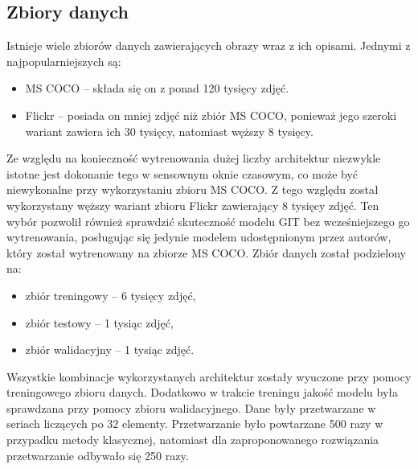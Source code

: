 \subsection{Zbiory danych}
Istnieje wiele zbiorów danych zawierających obrazy wraz z ich opisami. Jednymi z najpopularniejszych są:
\begin{itemize}
    \item MS COCO \cite{mscoco} -- składa się on z ponad 120 tysięcy zdjęć.
    \item Flickr \cite{flickr30k} -- posiada on mniej zdjęć niż zbiór MS COCO, ponieważ jego szeroki wariant zawiera ich 30 tysięcy, natomiast węższy 8 tysięcy.
\end{itemize}
Ze względu na konieczność wytrenowania dużej liczby architektur niezwykle istotne jest dokonanie tego w sensownym oknie czasowym, co może być niewykonalne przy wykorzystaniu zbioru MS COCO. Z tego względu został wykorzystany węższy wariant zbioru Flickr zawierający 8 tysięcy zdjęć. Ten wybór pozwolił również sprawdzić skuteczność modelu GIT bez wcześniejszego go wytrenowania, posługując się jedynie modelem udostępnionym przez autorów, który został wytrenowany na zbiorze MS COCO.
Zbiór danych został podzielony na:
\begin{itemize}
    \item zbiór treningowy -- 6 tysięcy zdjęć,
    \item zbiór testowy -- 1 tysiąc zdjęć,
    \item zbiór walidacyjny -- 1 tysiąc zdjęć.
\end{itemize}

\noindent Wszystkie kombinacje wykorzystanych architektur zostały wyuczone przy pomocy treningowego zbioru danych. Dodatkowo w trakcie treningu jakość modelu była sprawdzana przy pomocy zbioru walidacyjnego. Dane były przetwarzane w seriach liczących po 32 elementy. Przetwarzanie było powtarzane 500 razy w przypadku metody klasycznej, natomiast dla zaproponowanego rozwiązania przetwarzanie odbywało się 250 razy.
